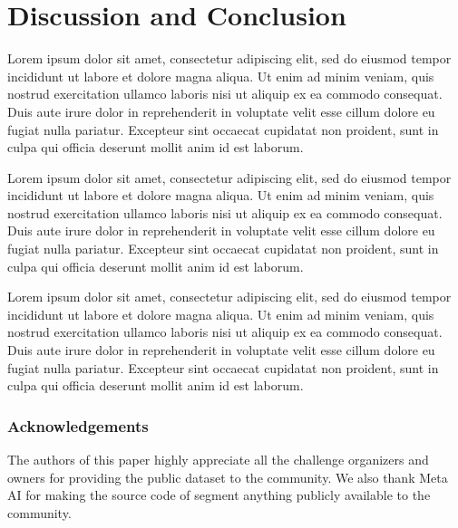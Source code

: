\documentclass[runningheads]{llncs}
\begin{document}
\section{Discussion and Conclusion}

{\color{red} 
Lorem ipsum dolor sit amet, consectetur adipiscing elit, sed do eiusmod tempor incididunt ut labore et dolore magna aliqua. Ut enim ad minim veniam, quis nostrud exercitation ullamco laboris nisi ut aliquip ex ea commodo consequat. Duis aute irure dolor in reprehenderit in voluptate velit esse cillum dolore eu fugiat nulla pariatur. Excepteur sint occaecat cupidatat non proident, sunt in culpa qui officia deserunt mollit anim id est laborum.

Lorem ipsum dolor sit amet, consectetur adipiscing elit, sed do eiusmod tempor incididunt ut labore et dolore magna aliqua. Ut enim ad minim veniam, quis nostrud exercitation ullamco laboris nisi ut aliquip ex ea commodo consequat. Duis aute irure dolor in reprehenderit in voluptate velit esse cillum dolore eu fugiat nulla pariatur. Excepteur sint occaecat cupidatat non proident, sunt in culpa qui officia deserunt mollit anim id est laborum.

Lorem ipsum dolor sit amet, consectetur adipiscing elit, sed do eiusmod tempor incididunt ut labore et dolore magna aliqua. Ut enim ad minim veniam, quis nostrud exercitation ullamco laboris nisi ut aliquip ex ea commodo consequat. Duis aute irure dolor in reprehenderit in voluptate velit esse cillum dolore eu fugiat nulla pariatur. Excepteur sint occaecat cupidatat non proident, sunt in culpa qui officia deserunt mollit anim id est laborum.
}




\subsubsection{Acknowledgements} 
The authors of this paper highly appreciate all the challenge organizers and owners for providing the public dataset to the community. We also thank Meta AI for making the source code of segment anything publicly available to the community. 

%
\newpage


\end{document}
